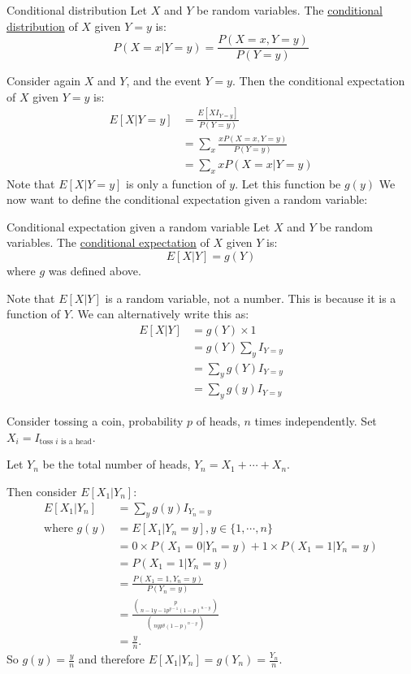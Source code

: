 \documentclass[../Main.tex]{subfiles}
\begin{document}
\begin{definition}{Conditional distribution}
    Let $X$ and $Y$ be random variables. The \underline{conditional distribution} of $X$ given $Y = y$ is:
    \begin{equation*}
        P(X = x | Y = y) = \frac{P(X = x, Y = y)}{P(Y = y)}
    \end{equation*}
\end{definition}
Consider again $X$ and $Y$, and the event $Y = y$. Then the conditional expectation of $X$ given $Y = y$ is:
\begin{align*}
    E[X | Y = y] &= \frac{E[X I_{Y = y}]}{P(Y = y)} \\
    &= \sum_x \frac{xP(X = x, Y = y)}{P(Y = y)} \\
    &= \sum_x x P(X = x | Y = y)
\end{align*}    
Note that $E[X | Y = y]$ is only a function of $y$. Let this function be $g(y)$
We now want to define the conditional expectation given a random variable:
\begin{definition}{Conditional expectation given a random variable}
    Let $X$ and $Y$ be random variables. The \underline{conditional expectation} of $X$ given $Y$ is:
    \begin{equation*}
        E[X | Y] = g(Y)
    \end{equation*}
    where $g$ was defined above.
\end{definition}
Note that $E[X | Y]$ is a random variable, not a number. This is because it is a function of $Y$. We can alternatively write this as:
\begin{align*}
    E[X | Y] &= g(Y) \times 1 \\
    &= g(Y) \sum_y I_{Y = y} \\
    &= \sum_y g(Y) I_{Y = y} \\
    &= \sum_y g(y) I_{Y = y}
\end{align*}
\begin{example}
    \label{exCoinTossCondExpec}
    Consider tossing a coin, probability $p$ of heads, $n$ times independently. Set $X_i = I_{\text{toss } i \text{ is a head}}$.\par
    Let $Y_n$ be the total number of heads, $Y_n = X_1 + \cdots + X_n$.\par
    Then consider $E[X_1 | Y_n]$:
    \begin{align*}
        E[X_1 | Y_n] &= \sum_y g(y) I_{Y_n = y} \\
        \text{where } g(y) &= E[X_1 | Y_n = y], y \in \{1, \cdots, n\} \\
        &= 0 \times P(X_1 = 0 | Y_n = y) + 1 \times P(X_1 = 1 | Y_n = y) \\
        &= P(X_1 = 1 | Y_n = y) \\
        &= \frac{P(X_1 = 1, Y_n = y)}{P(Y_n = y)} \\
        &= \frac{p \choose{n-1}{y-1} p^{y-1} (1-p)^{n-y}}{\choose{n}{y} p^y (1-p)^{n-y}} \\
        &= \frac{y}{n}.
    \end{align*}
    So $g(y) = \frac{y}{n}$ and therefore $E[X_1 | Y_n] = g(Y_n) = \frac{Y_n}{n}$.
\end{example}
\end{document}
